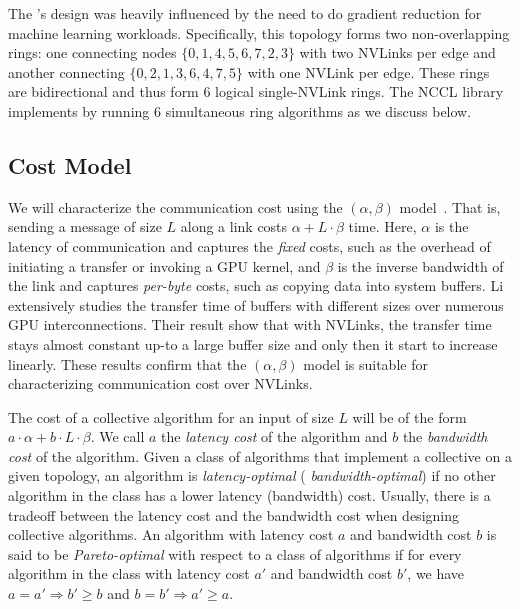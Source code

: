 The \dgxone's design was heavily influenced by the need to do gradient
reduction for machine learning workloads. Specifically, this topology
forms two non-overlapping rings: one connecting nodes
$\{0,1,4,5,6,7,2,3\}$ with two NVLinks per edge and another connecting
$\{0,2,1,3,6,4,7,5\}$ with one NVLink per edge. These rings are
bidirectional and thus form $6$ logical single-NVLink rings. The NCCL
library implements \allgather by running $6$ simultaneous ring
algorithms as we discuss below.


\subsection{Cost Model}

We will characterize the communication cost using the $(\alpha,
\beta)$ model~\cite{hockney1994communication}. That is, sending a
message of size $L$ along a link costs $\alpha + L\cdot\beta$ time.
Here, $\alpha$ is the latency of communication and captures the {\em
fixed} costs, such as the overhead of initiating a transfer or
invoking a GPU kernel, and $\beta$ is the inverse bandwidth of the
link and captures {\em per-byte} costs, such as copying data into
system buffers. Li \etal{} extensively studies the transfer time of
buffers with different sizes over numerous GPU
interconnections\cite{alphabeta}. Their result show that with NVLinks,
the transfer time stays almost constant up-to a large buffer size and
only then it start to increase linearly. These results confirm that
the $(\alpha,\beta)$ model is suitable for characterizing
communication cost over NVLinks.

The cost of a collective algorithm for an input of size $L$ will be of
the form $a\cdot\alpha + b \cdot L \cdot \beta$. We call $a$ the {\em
latency cost} of the algorithm and $b$ the {\em bandwidth cost} of the
algorithm. Given a class of algorithms that implement a collective on
a given topology, an algorithm is {\em latency-optimal} ({\em
bandwidth-optimal}) if no other algorithm in the class has a lower
latency (bandwidth) cost. Usually, there is a tradeoff between the
latency cost and the bandwidth cost when designing collective
algorithms.  An algorithm with latency cost $a$ and bandwidth cost $b$
is said to be {\em Pareto-optimal} with respect to a class of
algorithms if for every algorithm in the class with latency cost $a'$
and bandwidth cost $b'$, we have $a = a' \Rightarrow b' \geq b$ and $b
= b' \Rightarrow  a' \geq a$.

